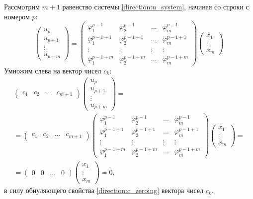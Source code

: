 Рассмотрим $m+1$ равенство системы \eqref{direction:u_system}, начиная со строки с номером $p$:
\[
    \begin{pmatrix}
        u_p     \\
        u_{p+1} \\
        \vdots  \\
        u_{p+m}
    \end{pmatrix}
    =
    \begin{pmatrix}
        \varphi_1^{p-1}   & \varphi_2^{p-1}   & \dots  & \varphi_m^{p-1}   \\
        \varphi_1^{p-1+1} & \varphi_2^{p-1+1} & \dots  & \varphi_m^{p-1+1} \\
        \vdots            & \vdots            & \vdots & \vdots            \\
        \varphi_1^{p-1+m} & \varphi_2^{p-1+m} & \dots  & \varphi_m^{p-1+m}
    \end{pmatrix}
    \begin{pmatrix}
        x_1    \\
        \vdots \\
        x_m
    \end{pmatrix}
\]
Умножим слева на вектор чисел $c_k$:
\begin{multline*}
    \begin{pmatrix}
        c_1 & c_2 & \dots & c_{m+1}
    \end{pmatrix}
    \begin{pmatrix}
        u_p     \\
        u_{p+1} \\
        \vdots  \\
        u_{p+m}
    \end{pmatrix} = \\
    = \begin{pmatrix}
        c_1 & c_2 & \dots & c_{m+1}
    \end{pmatrix}
    \begin{pmatrix}
        \varphi_1^{p-1}   & \varphi_2^{p-1}   & \dots  & \varphi_m^{p-1}   \\
        \varphi_1^{p-1+1} & \varphi_2^{p-1+1} & \dots  & \varphi_m^{p-1+1} \\
        \vdots            & \vdots            & \vdots & \vdots            \\
        \varphi_1^{p-1+m} & \varphi_2^{p-1+m} & \dots  & \varphi_m^{p-1+m}
    \end{pmatrix}
    \begin{pmatrix}
        x_1    \\
        \vdots \\
        x_m
    \end{pmatrix} = \\
    = \begin{pmatrix}
        0 & 0 & \dots & 0
    \end{pmatrix}
    \begin{pmatrix}
        x_1    \\
        \vdots \\
        x_m
    \end{pmatrix}
    = 0 ,
\end{multline*}
в силу обнуляющего свойства \eqref{direction:c_zeroing} вектора чисел $c_k$.

